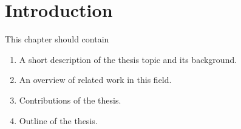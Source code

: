 
\chapter{Introduction}
\label{ch:introduction}

This chapter should contain
\begin{enumerate}
  \item A short description of the thesis topic and its background.
  \item An overview of related work in this field.
  \item Contributions of the thesis.
  \item Outline of the thesis.
\end{enumerate}

